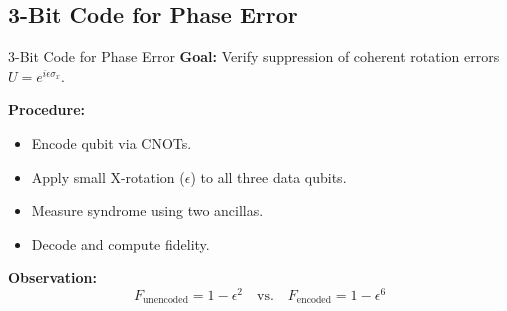 \documentclass[10pt]{beamer}
\begin{document}
\subsection{3-Bit Code for Phase Error}
\begin{frame}{3-Bit Code for Phase Error}
\textbf{Goal:} Verify suppression of coherent rotation errors $U = e^{i\epsilon \sigma_x}$.

\textbf{Procedure:}
\begin{itemize}
    \item Encode qubit via CNOTs.
    \item Apply small X-rotation ($\epsilon$) to all three data qubits.
    \item Measure syndrome using two ancillas.
    \item Decode and compute fidelity.
\end{itemize}

\textbf{Observation:}
\[
F_{\text{unencoded}} = 1 - \epsilon^2 \quad \text{vs.} \quad F_{\text{encoded}} = 1 - \epsilon^6
\]

\begin{figure}[h!]
    \centering


\end{figure}
\end{frame}
\end{document}
